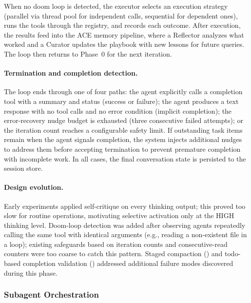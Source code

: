 When no doom loop is detected, the executor selects an execution strategy (parallel via thread pool for independent calls, sequential for dependent ones), runs the tools through the registry, and records each outcome. After execution, the results feed into the ACE memory pipeline, where a Reflector analyzes what worked and a Curator updates the playbook with new lessons for future queries. The loop then returns to Phase~0 for the next iteration.

\paragraph{Termination and completion detection.}
\label{sec:completion}
The loop ends through one of four paths: the agent explicitly calls a completion tool with a summary and status (success or failure); the agent produces a text response with no tool calls and no error condition (implicit completion); the error-recovery nudge budget is exhausted (three consecutive failed attempts); or the iteration count reaches a configurable safety limit. If outstanding task items remain when the agent signals completion, the system injects additional nudges to address them before accepting termination to prevent premature completion with incomplete work. In all cases, the final conversation state is persisted to the session store.

\paragraph{Design evolution.} Early experiments applied self-critique on every thinking output; this proved too slow for routine operations, motivating selective activation only at the HIGH thinking level. Doom-loop detection was added after observing agents repeatedly calling the same tool with identical arguments (e.g., reading a non-existent file in a loop); existing safeguards based on iteration counts and consecutive-read counters were too coarse to catch this pattern. Staged compaction () and todo-based completion validation () addressed additional failure modes discovered during this phase.


\subsubsection{Subagent Orchestration}
\label{sec:subagents}

